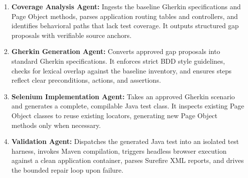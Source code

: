 \documentclass[pdflatex,sn-mathphys-num]{sn-jnl}
\begin{document}
\begin{table}[t]
\caption{Specialized multi-agent roles and state contracts in the BEWT-CovExt framework.}\label{tab:agent-roles}
\centering
\scriptsize
{}
\end{table}

\begin{enumerate}
    \item \textbf{Coverage Analysis Agent:} Ingests the baseline Gherkin specifications and Page Object methods, parses application routing tables and controllers, and identifies behavioral paths that lack test coverage. It outputs structured gap proposals with verifiable source anchors.
    \item \textbf{Gherkin Generation Agent:} Converts approved gap proposals into standard Gherkin specifications. It enforces strict BDD style guidelines, checks for lexical overlap against the baseline inventory, and ensures steps reflect clear preconditions, actions, and assertions.
    \item \textbf{Selenium Implementation Agent:} Takes an approved Gherkin scenario and generates a complete, compilable Java test class. It inspects existing Page Object classes to reuse existing locators, generating new Page Object methods only when necessary.
    \item \textbf{Validation Agent:} Dispatches the generated Java test into an isolated test harness, invokes Maven compilation, triggers headless browser execution against a clean application container, parses Surefire XML reports, and drives the bounded repair loop upon failure.
\end{enumerate}
\end{document}
